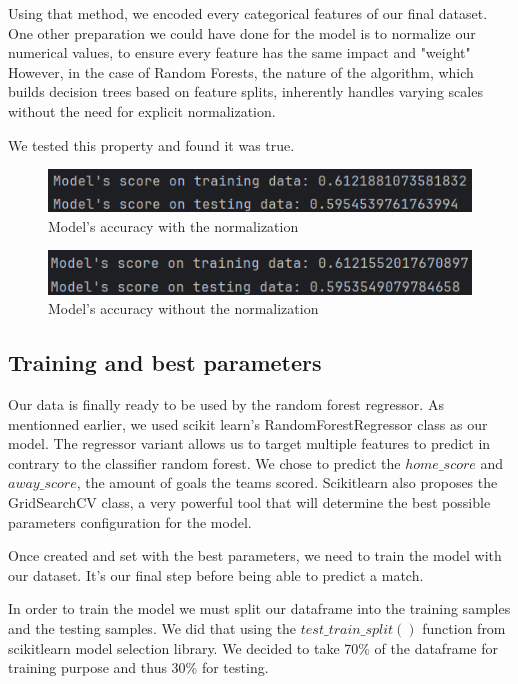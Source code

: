 \newpage
Using that method, we encoded every categorical features of our final dataset. 
One other preparation we could have done for the model is to normalize our numerical values, to ensure every feature has the same impact and "weight"
However, in the case of Random Forests, the nature of the algorithm, which builds decision trees based on feature splits, inherently handles varying scales without the need for explicit normalization.

We tested this property and found it was true.\\
\begin{figure}[h]
  \centering
  \includegraphics[width=0.8\linewidth]{withNormalization.png}
  \caption{Model's accuracy with the normalization}
\end{figure}

\begin{figure}[h]
  \centering
  \includegraphics[width=0.8\linewidth]{withoutNormalization.png}
  \caption{Model's accuracy without the normalization}
\end{figure}

\subsection{Training and best parameters}
Our data is finally ready to be used by the random forest regressor.
As mentionned earlier, we used scikit learn's RandomForestRegressor class as our model.
The regressor variant allows us to target multiple features to predict in contrary to the classifier random forest.
We chose to predict the $home\_score$ and $away\_score$, the amount of goals the teams scored.
Scikitlearn also proposes the GridSearchCV class, a very powerful tool that will determine the best possible parameters configuration for the model.

Once created and set with the best parameters, we need to train the model with our dataset. 
It's our final step before being able to predict a match.

In order to train the model we must split our dataframe into the training samples and the testing samples.
We did that using the $test\_train\_split()$ function from scikitlearn model selection library.
We decided to take 70\% of the dataframe for training purpose and thus 30\% for testing.

